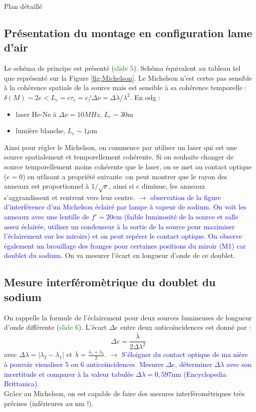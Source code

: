 \begin{reportBlock}{Plan détaillé}
  \subsection{Présentation du montage en configuration lame d'air}
  Le schéma de principe est présenté (\textcolor{green}{slide 5}). Schéma équivalent au tableau tel que représenté sur la Figure \ref{fig:Michelson}.
  Le Michelson n'est certes pas sensible à la cohérence spatiale de la source mais est sensible à sa cohérence temporelle : $\delta(M)\sim 2e<L_c=c\tau_c=c/\Delta\nu=\Delta\lambda/\lambda^2 $. En odg : 
  \begin{itemize}
      \item laser He-Ne à $\Delta\nu=10MHz$, $L_c\sim 30$m
      \item lumière blanche, $L_c\sim 1\mu$m
  \end{itemize}
  Ainsi pour régler le Michelson, on commence par utiliser un laser qui est une source spatialement et temporellement cohérente. Si on souhaite changer de source temporellement moins cohérente que le laser, on se met au contact optique ($e=0$) en utlisant a propriété suivante :on peut montrer que le rayon des anneaux est proportionnel à $1/\sqrt{e}$, ainsi si $e$ diminue, les anneaux s'aggrandissent et rentrent vers leur centre.\newline
  $\rightarrow$ \textcolor{blue}{observation de la figure d'interférence d'un Michelson éclairé par lampe à vapeur de sodium. On voit les anneaux avec une lentille de $f'=20$cm (faible luminosité de la source et salle assez éclairée, utiliser un condenseur à la sortie de la source pour maximiser l'éclairement sur les miroirs) et on peut repérer le contact optique. On observe également un brouillage des franges pour certaines positions du miroir (M1) car doublet du sodium.}\newline
  On va mesurer l'écart en longueur d'onde de ce doublet.
  
  \subsection{Mesure interféromètrique du doublet du sodium}
  On rappelle la formule de l'éclairement pour deux sources lumineuses de longueur d'onde différente (\textcolor{green}{slide 6}). L'écart $\Delta e$ entre deux anticoïncidences est donné par :
  \begin{equation}
      \Delta e = \frac{\bar{{\lambda}}}{2\Delta\lambda^2}
  \end{equation}
  avec $\Delta\lambda =|\lambda_2-\lambda_1|$ et $\bar{{\lambda}}=\frac{\lambda_1+\lambda_2}{2}$.\newline
  $\rightarrow$ \textcolor{blue}{S'éloigner du contact optique de ma nière à pouvoir visualiser 5 ou 6 anticoïncidences. Mesurer $\Delta e$, déterminer $\Delta\lambda$ avec son incertitude et comparer à la valeur tabulée $\Delta\lambda=0,597$nm (Encyclopedia Brittanica).}\\
  Grâce au Michelson, on est capable de faire des mesures interféromètriques très précises (inférieures au nm !).
  

\end{reportBlock}
